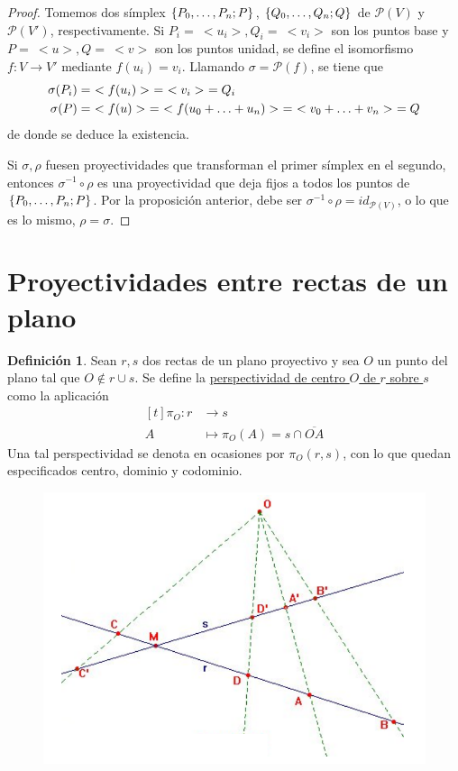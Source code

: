 \documentclass[12pt]{report}
\theoremstyle{definition}
\newtheorem{definition}{Definición}[chapter]
\theoremstyle{definition}
\theoremstyle{remark}
\begin{document}
\begin{proof}
Tomemos dos símplex $\{P_0,\mathellipsis,P_n;P\}$, $\{Q_0,\mathellipsis,Q_n;Q\}$ de $\mathcal{P}(V)$ y $\mathcal{P}(V')$, respectivamente. Si $P_i = \ <u_i>, Q_i = \ <v_i>$ son los puntos base y $P = \ <u>, Q= \ <v>$ son los puntos unidad, se define el isomorfismo $f \colon V \to V'$ mediante $f(u_i) = v_i$. Llamando $\sigma = \mathcal{P}(f)$, se tiene que
\[
\begin{aligned}[t]
\sigma(P_i) &= \ <f(u_i)> \ = \ <v_i> \ = Q_i \\
\sigma(P) &= \ <f(u)> \ = \ <f(u_0+\mathellipsis+u_n)> \ = \ <v_0+\mathellipsis+v_n> \ = Q
\end{aligned}
\]
de donde se deduce la existencia.

\vspace{2mm}
Si $\sigma, \rho$ fuesen proyectividades que transforman el primer símplex en el segundo, entonces $\sigma^{-1} 
\circ \rho$ es una proyectividad que deja fijos a todos los puntos de $\{P_0,\mathellipsis,P_n;P\}$. Por la proposición anterior, debe ser $\sigma^{-1} \circ \rho = id_{\mathcal{P}(V)}$, o lo que es lo mismo, $\rho = \sigma$.
\end{proof}

\section{Proyectividades entre rectas de un plano}

\begin{definition}
Sean $r, s$ dos rectas de un plano proyectivo y sea $O$ un punto del plano tal que $O \notin r \cup s$. Se define la \ul{perspectividad de centro $O$ de $r$ sobre $s$} como la aplicación
\[
\begin{aligned}[t]
    \pi_O \colon r &\longrightarrow s \\
    A &\longmapsto \pi_O(A) = s \cap \overline{OA}
\end{aligned}
\]
Una tal perspectividad se denota en ocasiones por $\pi_O(r,s)$, con lo que quedan especificados centro, dominio y codominio.
\end{definition}

\begin{figure}[h]
\includegraphics[scale = 0.4]{2.6_1}
\centering
\end{figure}
\end{document}
